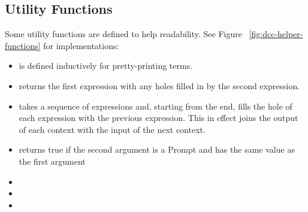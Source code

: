 \subsection{Utility Functions}
Some utility functions are defined to help readability. See Figure ~\ref{fig:dcc-helper-functions} for implementations:

\begin{itemize}\itemsep0.1cm

\item {} is defined inductively for pretty-printing terms.

\item {} returns the first expression with any holes filled in by the second expression.

\item {} takes a sequence of expressions and, starting from the end, fills the hole of each expression with the previous expression. This in effect joins the output of each context with the input of the next context.

\item {} returns true if the second argument is a Prompt and has the same value as the first argument

\item {} 
\item {}
\item {}

\end{itemize}


